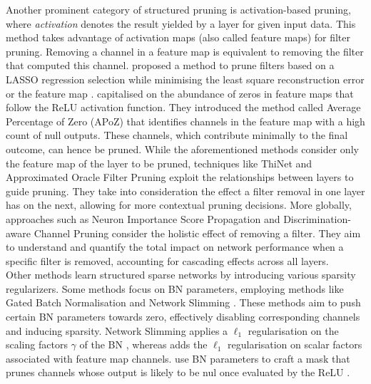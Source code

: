 Another prominent category of structured pruning is activation-based pruning,
where \emph{activation} denotes the result yielded by a layer for given input
data. This method takes advantage of activation maps (also called feature maps)
for filter pruning. Removing a channel in a feature map is equivalent to
removing the filter that computed this channel.
\citeauthor{DBLP:conf/iccv/HeZS17} proposed a method to prune filters based on a
LASSO regression selection while minimising the least square reconstruction
error or the feature map \cite{DBLP:conf/iccv/HeZS17}.
\citeauthor{DBLP:journals/corr/HuPTT16} capitalised on the abundance of zeros in
feature maps that follow the \ac{ReLU} activation function. They introduced the
method called Average Percentage of Zero (APoZ) that identifies channels in the
feature map with a high count of null outputs. These channels, which contribute
minimally to the final outcome, can hence be pruned. While the aforementioned
methods consider only the feature map of the layer to be pruned, techniques like
ThiNet \cite{DBLP:conf/iccv/LuoWL17} and Approximated Oracle Filter Pruning
\cite{DBLP:conf/icml/DingDGHY19} exploit the relationships between layers to
guide pruning. They take into consideration the effect a filter removal in one
layer has on the next, allowing for more contextual pruning decisions. More
globally, approaches such as Neuron Importance Score Propagation
\cite{DBLP:conf/cvpr/Yu00LMHGLD18} and Discrimination-aware Channel Pruning
\cite{DBLP:conf/nips/ZhuangTZLGWHZ18} consider the holistic effect of removing a
filter. They aim to understand and quantify the total impact on network
performance when a specific filter is removed, accounting for cascading effects
across all layers.\\

Other methods learn structured sparse networks by introducing various sparsity
regularizers. Some methods focus on \acl{BN} parameters, employing methods like
Gated Batch Normalisation \cite{DBLP:conf/nips/YouYYM019} and Network Slimming
\cite{DBLP:conf/iccv/LiuLSHYZ17}. These methods aim to push certain BN
parameters towards zero, effectively disabling corresponding channels and
inducing sparsity. Network Slimming applies a $\ell_1$ regularisation on the
scaling factors $\gamma$ of the \ac{BN} \cite{DBLP:conf/iccv/LiuLSHYZ17},
whereas \cite{DBLP:conf/nips/YouYYM019} adds the $\ell_1$ regularisation on
scalar factors associated with feature map channels.
\citeauthor{DBLP:conf/icml/KangH20} use \ac{BN} parameters to craft a mask that
prunes channels whose output is likely to be nul once evaluated by the \ac{ReLU}
\cite{DBLP:conf/icml/KangH20}. \\

